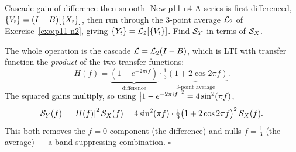 \begin{exercise}{Cascade gain of difference then smooth \quad\textnormal{[New]}}{p11-n4}
A series is first differenced, $\{V_t\}=(I-B)[\{X_t\}]$, then run through the
3-point average $\mathcal{L}_2$ of Exercise~\ref{exo:p11-n2}, giving
$\{Y_t\}=\mathcal{L}_2[\{V_t\}]$. Find $\mathcal{S}_Y$ in terms of $\mathcal{S}_X$.
\end{exercise}
\begin{solution}
The whole operation is the cascade $\mathcal{L}=\mathcal{L}_2(I-B)$, which is LTI with
transfer function the \emph{product} of the two transfer functions:
\[
H(f)=\underbrace{(1-e^{-2\pi i f})}_{\text{difference}}\cdot
\underbrace{\tfrac13(1+2\cos 2\pi f)}_{\text{3-point average}} .
\]
The squared gains multiply, so using
$\left\lvert 1-e^{-2\pi i f} \right\rvert^2=4\sin^2(\pi f)$,
\[
\mathcal{S}_Y(f)=\left\lvert H(f) \right\rvert^2\mathcal{S}_X(f)
=4\sin^2(\pi f)\cdot\tfrac19\big(1+2\cos 2\pi f\big)^2\,\mathcal{S}_X(f).
\]
This both removes the $f=0$ component (the difference) and nulls $f=\tfrac13$
(the average) --- a band-suppressing combination. \hfill$\square$
\end{solution}
